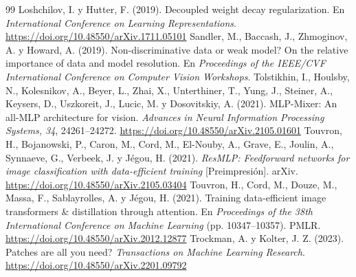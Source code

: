 \documentclass[11pt,a4paper]{article}
\begin{document}
\begin{thebibliography}{99}
 Loshchilov, I. y Hutter, F. (2019). Decoupled weight decay regularization. En \emph{International Conference on Learning Representations}. \url{https://doi.org/10.48550/arXiv.1711.05101}
 Sandler, M., Baccash, J., Zhmoginov, A. y Howard, A. (2019). Non-discriminative data or weak model? On the relative importance of data and model resolution. En \emph{Proceedings of the IEEE/CVF International Conference on Computer Vision Workshops}.
 Tolstikhin, I., Houlsby, N., Kolesnikov, A., Beyer, L., Zhai, X., Unterthiner, T., Yung, J., Steiner, A., Keysers, D., Uszkoreit, J., Lucic, M. y Dosovitskiy, A. (2021). MLP-Mixer: An all-MLP architecture for vision. \emph{Advances in Neural Information Processing Systems, 34}, 24261--24272. \url{https://doi.org/10.48550/arXiv.2105.01601}
 Touvron, H., Bojanowski, P., Caron, M., Cord, M., El-Nouby, A., Grave, E., Joulin, A., Synnaeve, G., Verbeek, J. y Jégou, H. (2021). \emph{ResMLP: Feedforward networks for image classification with data-efficient training} [Preimpresión]. arXiv. \url{https://doi.org/10.48550/arXiv.2105.03404}
 Touvron, H., Cord, M., Douze, M., Massa, F., Sablayrolles, A. y Jégou, H. (2021). Training data-efficient image transformers \& distillation through attention. En \emph{Proceedings of the 38th International Conference on Machine Learning} (pp. 10347--10357). PMLR. \url{https://doi.org/10.48550/arXiv.2012.12877}
 Trockman, A. y Kolter, J. Z. (2023). Patches are all you need? \emph{Transactions on Machine Learning Research}. \url{https://doi.org/10.48550/arXiv.2201.09792}
\end{thebibliography}
\end{document}
